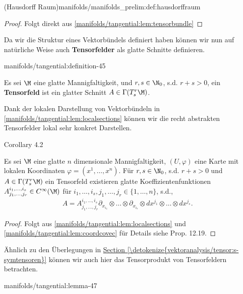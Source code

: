 \documentclass[letterpaper,10pt,english]{jupyterBook}
\begin{document}
\begin{definition}{(Hausdorff Raum)}{manifolds/manifolds_prelim:def:hausdorffraum}
\begin{proof}
 Folgt direkt aus \cref{manifolds/tangential:lem:tensorbundle} 
\end{proof}

\par
Da wir die Struktur eines Vektorbündels definiert haben können wir nun auf natürliche Weise auch \textbf{Tensorfelder} als glatte Schnitte definieren.
\begin{definition}{}{manifolds/tangential:definition-45}



\par
Es sei \(\M\) eine glatte Mannigfaltigkeit, und \(r,s\in\N_0\), s.d. \(r+s>0\), ein \textbf{Tensorfeld} ist ein glatter Schnitt \(A\in \Gamma(T^r_s\M)\).
\end{definition}

\par
Dank der lokalen Darstellung von Vektorbündeln in \cref{manifolds/tangential:lem:localsections} können wir die recht abstrakten Tensorfelder lokal sehr konkret Darstellen.
\label{manifolds/tangential:cor:tensorfieldchart}
\begin{emphBox}{}{}{Corollary 4.2}



\par
Es sei \(\M\) eine glatte \(n\) dimensionale Mannigfaltigkeit, \((U,\varphi)\) eine Karte mit lokalen Koordinaten \(\varphi=(x^1,\ldots,x^n)\). Für \(r,s\in\N_0\), s.d. \(r+s>0\) und \(A\in \Gamma(T^r_s\M)\) ein Tensorfeld existieren glatte Koeffizientenfunktionen \(A^{i_1,\ldots, i_s}_{j_1,\ldots,j_r}\in C^\infty(\M)\) für \(i_1,\ldots, i_s, j_1,\ldots, j_r\in \{1,\ldots,n\}\), s.d.,
\begin{align*}
A = A^{i_1,\ldots,i_s}_{j_1,\ldots,j_r} \partial_{x_{i_1}}\otimes\ldots\otimes \partial_{x_{i_r}}\otimes dx^{j_1}\otimes\ldots\otimes dx^{j_s}.
\end{align*}\end{emphBox}

\begin{proof}
 Folgt aus \cref{manifolds/tangential:lem:localsections} und \cref{manifolds/tangential:lem:coordcovec}   für Details siehe \cite{Lee03} Prop. 12.19.
\end{proof}

\par
Ähnlich zu den Überlegungen in \hyperref[\detokenize{vektoranalysis/tensor:s-symtensoren}]{Section \ref{\detokenize{vektoranalysis/tensor:s-symtensoren}}} können wir auch hier das Tensorprodukt von Tensorfeldern betrachten.
\begin{lemma}{}{manifolds/tangential:lemma-47}




\end{lemma}
\end{definition}
\end{document}
